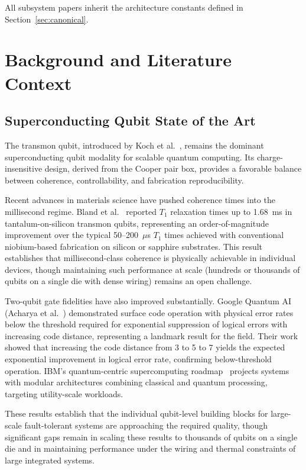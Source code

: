 \documentclass[conference]{IEEEtran}
\begin{document}
All subsystem papers inherit the architecture constants defined in Section~\ref{sec:canonical}.

\section{Background and Literature Context}

\subsection{Superconducting Qubit State of the Art}

The transmon qubit, introduced by Koch et al.~\cite{koch2007}, remains the dominant superconducting qubit modality for scalable quantum computing. Its charge-insensitive design, derived from the Cooper pair box, provides a favorable balance between coherence, controllability, and fabrication reproducibility.

Recent advances in materials science have pushed coherence times into the millisecond regime. Bland et al.~\cite{bland2025} reported $T_1$ relaxation times up to 1.68~ms in tantalum-on-silicon transmon qubits, representing an order-of-magnitude improvement over the typical 50--200~$\mu$s $T_1$ times achieved with conventional niobium-based fabrication on silicon or sapphire substrates. This result establishes that millisecond-class coherence is physically achievable in individual devices, though maintaining such performance at scale (hundreds or thousands of qubits on a single die with dense wiring) remains an open challenge.

Two-qubit gate fidelities have also improved substantially. Google Quantum AI (Acharya et al.~\cite{acharya2024}) demonstrated surface code operation with physical error rates below the threshold required for exponential suppression of logical errors with increasing code distance, representing a landmark result for the field. Their work showed that increasing the code distance from 3 to 5 to 7 yields the expected exponential improvement in logical error rate, confirming below-threshold operation. IBM's quantum-centric supercomputing roadmap~\cite{ibm2024, ibm2024b} projects systems with modular architectures combining classical and quantum processing, targeting utility-scale workloads.

These results establish that the individual qubit-level building blocks for large-scale fault-tolerant systems are approaching the required quality, though significant gaps remain in scaling these results to thousands of qubits on a single die and in maintaining performance under the wiring and thermal constraints of large integrated systems.
\end{document}
